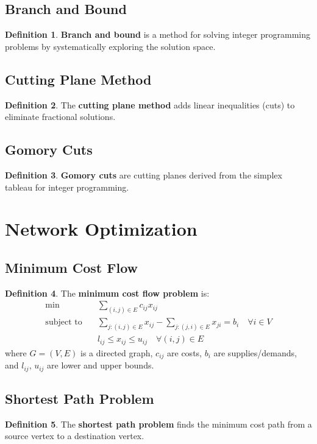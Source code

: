 \documentclass[11pt]{article}
\theoremstyle{definition}
\newtheorem{definition}{Definition}[section]
\begin{document}
\subsection{Branch and Bound}
\begin{definition}
\textbf{Branch and bound} is a method for solving integer programming problems by systematically exploring the solution space.
\end{definition}

\subsection{Cutting Plane Method}
\begin{definition}
The \textbf{cutting plane method} adds linear inequalities (cuts) to eliminate fractional solutions.
\end{definition}

\subsection{Gomory Cuts}
\begin{definition}
\textbf{Gomory cuts} are cutting planes derived from the simplex tableau for integer programming.
\end{definition}

\section{Network Optimization}

\subsection{Minimum Cost Flow}
\begin{definition}
The \textbf{minimum cost flow problem} is:
\begin{align}
\min \quad & \sum_{(i,j) \in E} c_{ij} x_{ij} \\
\text{subject to} \quad & \sum_{j:(i,j) \in E} x_{ij} - \sum_{j:(j,i) \in E} x_{ji} = b_i \quad \forall i \in V \\
& l_{ij} \leq x_{ij} \leq u_{ij} \quad \forall (i,j) \in E
\end{align}
where $G = (V,E)$ is a directed graph, $c_{ij}$ are costs, $b_i$ are supplies/demands, and $l_{ij}$, $u_{ij}$ are lower and upper bounds.
\end{definition}

\subsection{Shortest Path Problem}
\begin{definition}
The \textbf{shortest path problem} finds the minimum cost path from a source vertex to a destination vertex.
\end{definition}
\end{document}
